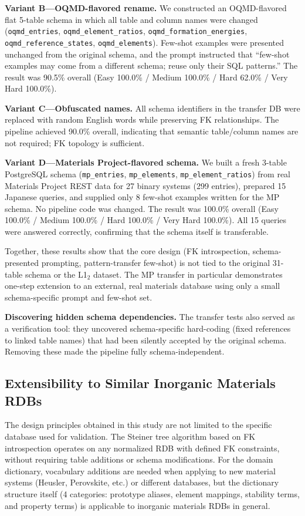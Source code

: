 \documentclass{npj-compt.mater}
\begin{document}
\textbf{Variant B---OQMD-flavored rename.}
We constructed an OQMD-flavored flat 5-table schema in which all
table and column names were changed
(\texttt{oqmd\_entries}, \texttt{oqmd\_element\_ratios},
\texttt{oqmd\_formation\_energies}, \texttt{oqmd\_reference\_states},
\texttt{oqmd\_elements}).
Few-shot examples were presented unchanged from the original schema,
and the prompt instructed that ``few-shot examples may come from a
different schema; reuse only their SQL patterns.''
The result was 90.5\% overall
(Easy 100.0\% / Medium 100.0\% / Hard 62.0\% / Very Hard 100.0\%).

\textbf{Variant C---Obfuscated names.}
All schema identifiers in the transfer DB were replaced with random
English words while preserving FK relationships. The pipeline
achieved 90.0\% overall, indicating that semantic table/column
names are not required; FK topology is sufficient.

\textbf{Variant D---Materials Project-flavored schema.}
We built a fresh 3-table PostgreSQL schema
(\texttt{mp\_entries}, \texttt{mp\_elements}, \texttt{mp\_element\_ratios})
from real Materials Project REST data for 27 binary systems (299
entries), prepared 15 Japanese queries, and supplied only 8
few-shot examples written for the MP schema. No pipeline code was
changed. The result was 100.0\% overall
(Easy 100.0\% / Medium 100.0\% / Hard 100.0\% / Very Hard 100.0\%).
All 15 queries were answered correctly, confirming that the schema itself is transferable.

Together, these results show that the core design (FK
introspection, schema-presented prompting, pattern-transfer
few-shot) is not tied to the original 31-table schema or the L1$_2$
dataset. The MP transfer in particular demonstrates one-step
extension to an external, real materials database using only a
small schema-specific prompt and few-shot set.

\textbf{Discovering hidden schema dependencies.}
The transfer tests also served as a verification tool: they
uncovered schema-specific hard-coding (fixed references to linked
table names) that had been silently accepted by the original
schema. Removing these made the pipeline fully schema-independent.

\subsection{Extensibility to Similar Inorganic Materials RDBs}
\label{sec:extensibility}

The design principles obtained in this study are not limited to
the specific database used for validation.
The Steiner tree algorithm based on FK introspection operates on
any normalized RDB with defined FK constraints, without requiring
table additions or schema modifications.
For the domain dictionary, vocabulary additions are needed when
applying to new material systems (Heusler, Perovskite, etc.) or
different databases, but the dictionary structure itself
(4 categories: prototype aliases, element mappings, stability
terms, and property terms) is applicable to inorganic materials
RDBs in general.
\end{document}
